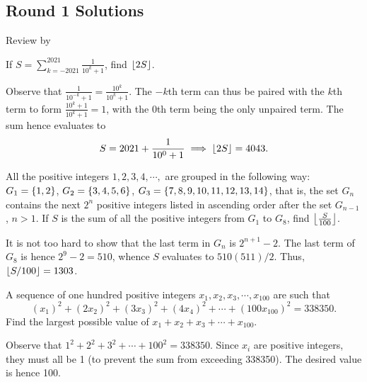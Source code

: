\subsection{Round 1 Solutions}\label{S::2022-O-1}

\begin{resources}
    Review by 
\end{resources}

\begin{question}[4043]\label{Q::2022-O-1-1}
    If $S = \displaystyle\sum_{k = -2021}^{2021} \frac{1}{10^k + 1}$, find $\left\lfloor 2S \right\rfloor$.
\end{question}
\begin{solution*}
    Observe that $\frac{1}{10^{-k} + 1} = \frac{10^k}{10^{k} + 1}$. The $-k$th term can thus be paired with the $k$th term to form $\frac{10^k + 1}{10^k + 1} = 1$, with the $0$th term being the only unpaired term. The sum hence evaluates to \[S = 2021 + \frac{1}{10^0 + 1} \implies \left\lfloor 2S \right\rfloor = 4043.\]
\end{solution*}

\begin{question}[1303]\label{Q::2022-O-1-2}
    All the positive integers $1, 2, 3, 4, \cdots,$ are grouped in the following way: $G_1 = \left\lbrace 1, 2 \right\rbrace$, $G_2 = \left\lbrace 3, 4, 5, 6 \right\rbrace$, $G_3 = \left\lbrace 7, 8, 9, 10, 11, 12, 13, 14 \right\rbrace$, that is, the set $G_n$ contains the next $2^n$ positive integers listed in ascending order after the set $G_{n-1}$, $n > 1$. If $S$ is the sum of all the positive integers from $G_1$ to $G_8$, find $\left\lfloor \frac{S}{100} \right\rfloor$.
\end{question}
\begin{solution*}
    It is not too hard to show that the last term in $G_n$ is $2^{n+1} - 2$. The last term of $G_8$ is hence $2^9 - 2 = 510$, whence $S$ evaluates to $510(511)/2$. Thus, $\left\lfloor S/100 \right\rfloor = 1303$.
\end{solution*}

\begin{question}[100]\label{Q::2022-O-1-3}
    A sequence of one hundred positive integers $x_1, x_2, x_3, \cdots, x_{100}$ are such that \[(x_1)^2 + (2x_2)^2 + (3x_3)^2 + (4x_4)^2 + \cdots + (100x_{100})^2 = 338350.\] Find the largest possible value of $x_1 + x_2 + x_3 + \cdots + x_{100}$.
\end{question}
\begin{solution*}
    Observe that $1^2 + 2^2 + 3^2 + \cdots + 100^2 = 338350$. Since $x_i$ are positive integers, they must all be 1 (to prevent the sum from exceeding 338350). The desired value is hence 100.
\end{solution*}

